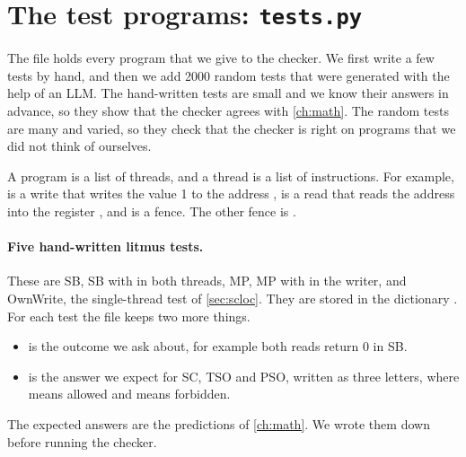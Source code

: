 \section{The test programs: \texttt{tests.py}}
\label{sec:testsfile}

The file  holds every program that we give to the checker. We first write a few tests by hand, and then we add 2000 random tests that were generated with the help of an LLM. The hand-written tests are small and we know their answers in advance, so they show that the checker agrees with \cref{ch:math}. The random tests are many and varied, so they check that the checker is right on programs that we did not think of ourselves.

A program is a list of threads, and a thread is a list of instructions. For example,  is a write that writes the value 1 to the address ,  is a read that reads the address  into the register , and  is a fence. The other fence is .

\paragraph{Five hand-written litmus tests.} These are SB, SB with  in both threads, MP, MP with  in the writer, and OwnWrite, the single-thread test of \cref{sec:scloc}. They are stored in the dictionary . For each test the file keeps two more things.
\begin{itemize}
\item {} is the outcome we ask about, for example both reads return 0 in SB.
\item {} is the answer we expect for SC, TSO and PSO, written as three letters, where  means allowed and  means forbidden.
\end{itemize}
The expected answers are the predictions of \cref{ch:math}. We wrote them down before running the checker.

